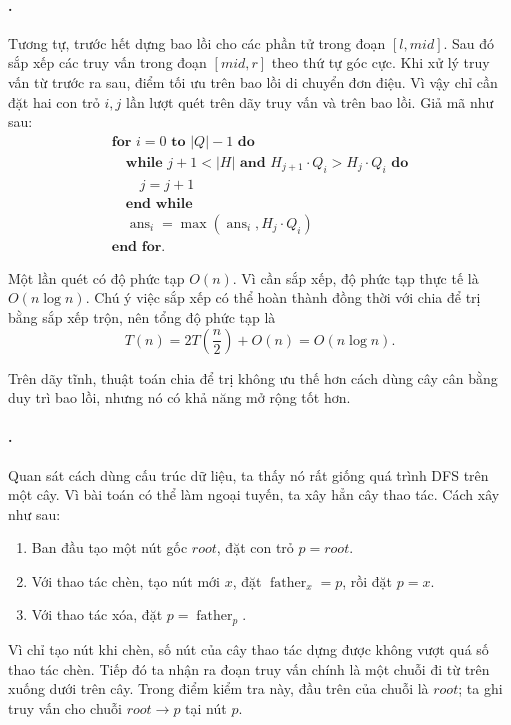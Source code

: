 \documentclass[11pt]{article}
\begin{document}
\paragraph{.}
Tương tự, trước hết dựng bao lồi cho các phần tử trong đoạn
\([l,\mathit{mid}]\). Sau đó sắp xếp các truy vấn trong đoạn
\([\mathit{mid},r]\) theo thứ tự góc cực. Khi xử lý truy vấn từ trước ra sau,
điểm tối ưu trên bao lồi di chuyển đơn điệu. Vì vậy chỉ cần đặt hai con trỏ
\(i,j\) lần lượt quét trên dãy truy vấn và trên bao lồi. Giả mã như sau:
\[
\begin{array}{l}
\textbf{for } i=0 \textbf{ to } |Q|-1 \textbf{ do}\\
\quad \textbf{while } j+1<|H| \textbf{ and } H_{j+1}\cdot Q_i>H_j\cdot Q_i
  \textbf{ do}\\
\quad\quad j=j+1\\
\quad \textbf{end while}\\
\quad \operatorname{ans}_i=\max(\operatorname{ans}_i,H_j\cdot Q_i)\\
\textbf{end for.}
\end{array}
\]

Một lần quét có độ phức tạp \(O(n)\). Vì cần sắp xếp, độ phức tạp thực tế là
\(O(n\log n)\). Chú ý việc sắp xếp có thể hoàn thành đồng thời với chia để trị
bằng sắp xếp trộn, nên tổng độ phức tạp là
\[
  T(n)=2T\left(\frac n2\right)+O(n)=O(n\log n).
\]

Trên dãy tĩnh, thuật toán chia để trị không ưu thế hơn cách dùng cây cân bằng
duy trì bao lồi, nhưng nó có khả năng mở rộng tốt hơn.

\paragraph{.}
Quan sát cách dùng cấu trúc dữ liệu, ta thấy nó rất giống quá trình DFS trên
một cây. Vì bài toán có thể làm ngoại tuyến, ta xây hẳn cây thao tác. Cách
xây như sau:
\begin{enumerate}
  \item Ban đầu tạo một nút gốc \(\mathit{root}\), đặt con trỏ
  \(p=\mathit{root}\).
  \item Với thao tác chèn, tạo nút mới \(x\), đặt \(\operatorname{father}_x=p\),
  rồi đặt \(p=x\).
  \item Với thao tác xóa, đặt \(p=\operatorname{father}_p\).
\end{enumerate}

Vì chỉ tạo nút khi chèn, số nút của cây thao tác dựng được không vượt quá số
thao tác chèn. Tiếp đó ta nhận ra đoạn truy vấn chính là một chuỗi đi từ trên
xuống dưới trên cây. Trong điểm kiểm tra này, đầu trên của chuỗi là
\(\mathit{root}\); ta ghi truy vấn cho chuỗi \(\mathit{root}\to p\) tại nút
\(p\).
\end{document}
